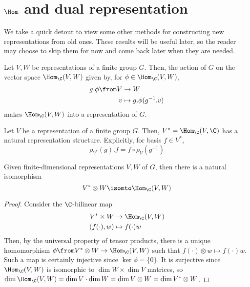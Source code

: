 \documentclass[11pt,leqno,oneside]{amsbook}
\numberwithin{thm}{section}
\begin{document}
\section{\(\Hom\) and dual representation}
We take a quick detour to view some other methods for constructing new
representations from old ones. These results will be useful later, so
the reader may choose to skip them for now and come back later when
they are needed.
\begin{prop}\label{def-hom-rep}
  Let \(V,W\) be representations of a finite group \(G\). Then, the
  action of \(G\) on 
  the vector space \(\Hom_\C(V,W)\) given by, for \(\phi \in \Hom_\C(V,W)\),
  \begin{align*}
    g.\phi \from V & \to W \\
    v & \mapsto g.\phi(g^{-1}.v)
  \end{align*}
  makes \(\Hom_\C(V,W)\) into a representation of \(G\). 
\end{prop}
\begin{cor}\label{def-dual-rep}
  Let \(V\) be a representation of a finite group \(G\). Then, \(V^* =
  \Hom_\C(V,\C)\) has a natural representation
  structure. Explicitly, for basis \(f \in V^*\), \[
    \rho_{V^*}(g).f = f \circ \rho_V(g^{-1}) 
  \]
\end{cor}
\begin{prop}\label{tensor-hom-relation}
  Given finite-dimensional representations \(V,W\) of \(G\), then
  there is a natural 
  isomorphism \[
    V^* \otimes W \isomto \Hom_\C(V,W)
  \]
\end{prop}
\begin{proof}
  Consider the \(\C\)-bilinear map
  \begin{align*}
    V^* \times W & \to \Hom_\C(V,W) \\
    (f(\cdot),w) & \mapsto f(\cdot) w
  \end{align*}
  Then, by the universal property of tensor products, there is a
  unique homomorphism \(\phi \from V^* \otimes W \to \Hom_\C(V,W)\)
  such that \(f(\cdot) \otimes w \mapsto f(\cdot) w\). Such a map is
  certainly injective since \(\ker \phi = \{0\}\). It is surjective
  since \(\Hom_\C(V,W)\) is isomorphic to \(\dim W \times \dim V\)
  matrices, so \(\dim \Hom_\C(V,W) = \dim V \cdot \dim W = \dim V
  \otimes W = \dim V^* \otimes W\). 
\end{proof}
\end{document}
